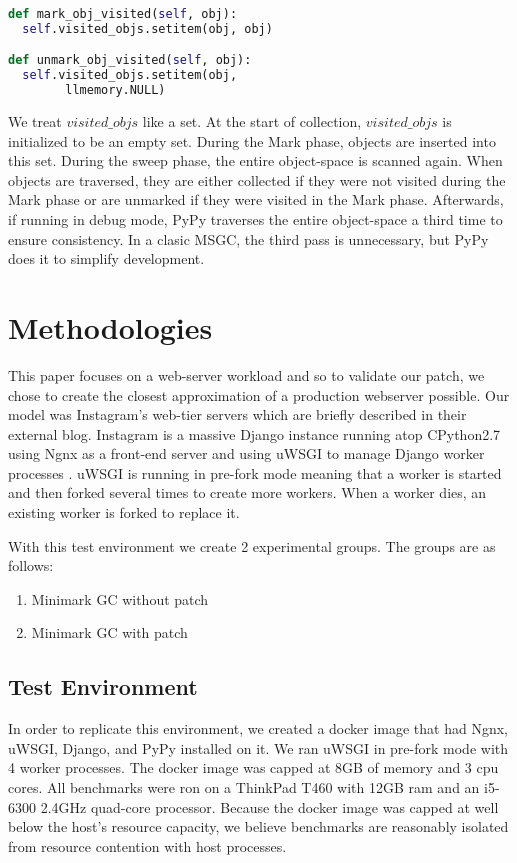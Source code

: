\documentclass{article}
\begin{document}
\begin{sloppypar}
\begin{minipage}{\linewidth}
\begin{lstlisting}[language=python]
def mark_obj_visited(self, obj):
  self.visited_objs.setitem(obj, obj)

def unmark_obj_visited(self, obj):
  self.visited_objs.setitem(obj,
        llmemory.NULL)
\end{lstlisting}
\end{minipage}

We treat $visited\_objs$ like a set.  At the start of collection, $visited\_objs$ is initialized to be an empty set.  During the Mark phase, objects are inserted into this set.  During the sweep phase, the entire object-space is scanned again.  When objects are traversed, they are either collected if they were not visited during the Mark phase or are unmarked if they were visited in the Mark phase.  Afterwards, if running in debug mode, PyPy traverses the entire object-space a third time to ensure consistency.  In a clasic MSGC, the third pass is unnecessary, but PyPy does it to simplify development.  

\section{Methodologies}\label{sec:method}

This paper focuses on a web-server workload and so to validate our patch, we chose to create the closest approximation of a production webserver possible.  Our model was Instagram's web-tier servers which are briefly described in their external blog.  Instagram is a massive Django instance running atop CPython2.7 using Ngnx as a front-end server and using uWSGI to manage Django worker processes \cite{dismissing_garbage}.  uWSGI is running in pre-fork mode meaning that a worker is started and then forked several times to create more workers.  When a worker dies, an existing worker is forked to replace it.  

With this test environment we create 2 experimental groups.  The groups are as follows:

\begin{enumerate}
    \item Minimark GC without patch
    \item Minimark GC with patch
\end{enumerate}

\subsection{Test Environment}

In order to replicate this environment, we created a docker image that had Ngnx, uWSGI, Django, and PyPy installed on it.  We ran uWSGI in pre-fork mode with 4 worker processes.  The docker image was capped at 8GB of memory and 3 cpu cores.  All benchmarks were ron on a ThinkPad T460 with 12GB ram and an i5-6300 2.4GHz quad-core processor.  Because the docker image was capped at well below the host's resource capacity, we believe benchmarks are reasonably isolated from resource contention with host processes.


\end{sloppypar}
\end{document}
